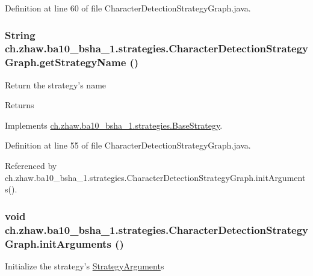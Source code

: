 Definition at line 60 of file CharacterDetectionStrategyGraph.java.\hypertarget{classch_1_1zhaw_1_1ba10__bsha__1_1_1strategies_1_1CharacterDetectionStrategyGraph_a3d897fb9be39b36575cf7d4630580445}{
\subsubsection[{getStrategyName}]{\setlength{\rightskip}{0pt plus 5cm}String ch.zhaw.ba10\_\-bsha\_\-1.strategies.CharacterDetectionStrategyGraph.getStrategyName ()}}
\label{classch_1_1zhaw_1_1ba10__bsha__1_1_1strategies_1_1CharacterDetectionStrategyGraph_a3d897fb9be39b36575cf7d4630580445}
Return the strategy's name

\begin{DoxyReturn}{Returns}

\end{DoxyReturn}


Implements \hyperlink{classch_1_1zhaw_1_1ba10__bsha__1_1_1strategies_1_1BaseStrategy_aa0ebed55eed45409bad13d43a0058780}{ch.zhaw.ba10\_\-bsha\_\-1.strategies.BaseStrategy}.

Definition at line 55 of file CharacterDetectionStrategyGraph.java.

Referenced by ch.zhaw.ba10\_\-bsha\_\-1.strategies.CharacterDetectionStrategyGraph.initArguments().\hypertarget{classch_1_1zhaw_1_1ba10__bsha__1_1_1strategies_1_1CharacterDetectionStrategyGraph_ab1ddc7964a2da79d65ca7227423ae8c6}{
\subsubsection[{initArguments}]{\setlength{\rightskip}{0pt plus 5cm}void ch.zhaw.ba10\_\-bsha\_\-1.strategies.CharacterDetectionStrategyGraph.initArguments ()}}
\label{classch_1_1zhaw_1_1ba10__bsha__1_1_1strategies_1_1CharacterDetectionStrategyGraph_ab1ddc7964a2da79d65ca7227423ae8c6}
Initialize the strategy's \hyperlink{classch_1_1zhaw_1_1ba10__bsha__1_1_1StrategyArgument}{StrategyArgument}s 

